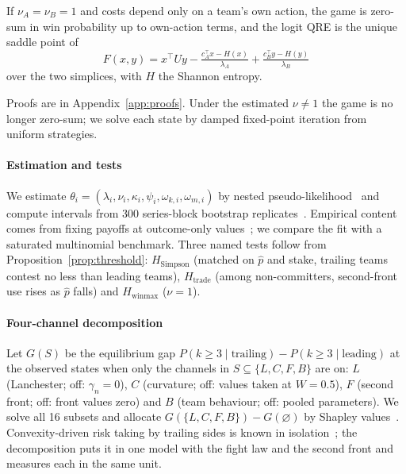 \begin{proposition}[Uniqueness]\label{prop:unique}
If $\nu_A=\nu_B=1$ and costs depend only on a team's own action, the game is zero-sum in win probability up to own-action terms, and the logit QRE is the unique saddle point of
\[
F(x,y)=x^\top Uy-\tfrac{c_A^\top x-H(x)}{\lambda_A}+\tfrac{c_B^\top y-H(y)}{\lambda_B}
\]
over the two simplices, with $H$ the Shannon entropy.
\end{proposition}
Proofs are in Appendix~\ref{app:proofs}.
Under the estimated $\nu\neq1$ the game is no longer zero-sum; we solve each state by damped fixed-point iteration from uniform strategies.

\paragraph*{Estimation and tests}
We estimate $\theta_i=(\lambda_i,\nu_i,\kappa_i,\psi_i,\omega_{k,i},\omega_{m,i})$ by nested pseudo-likelihood~\cite{aguirregabiria2007sequential} and compute intervals from 300 series-block bootstrap replicates~\cite{kunsch1989jackknife}.
Empirical content comes from fixing payoffs at outcome-only values~\cite{haile2008empirical}; we compare the fit with a saturated multinomial benchmark.
Three named tests follow from Proposition~\ref{prop:threshold}: $H_{\mathrm{Simpson}}$ (matched on $\hat p$ and stake, trailing teams contest no less than leading teams), $H_{\mathrm{trade}}$ (among non-committers, second-front use rises as $\hat p$ falls) and $H_{\mathrm{winmax}}$ ($\nu=1$).

\paragraph*{Four-channel decomposition}
Let $G(S)$ be the equilibrium gap $P(k\geq3\mid\text{trailing})-P(k\geq3\mid\text{leading})$ at the observed states when only the channels in $S\subseteq\{L,C,F,B\}$ are on: $L$ (Lanchester; off: $\gamma_n=0$), $C$ (curvature; off: values taken at $W=0.5$), $F$ (second front; off: front values zero) and $B$ (team behaviour; off: pooled parameters).
We solve all 16 subsets and allocate $G(\{L,C,F,B\})-G(\varnothing)$ by Shapley values~\cite{shapley1953value}.
Convexity-driven risk taking by trailing sides is known in isolation~\cite{cabral2003rd,skinner2011scoring}; the decomposition puts it in one model with the fight law and the second front and measures each in the same unit.
